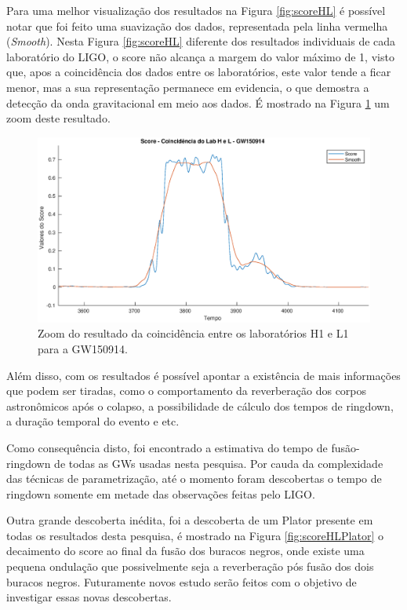 Para uma melhor visualização dos resultados na Figura \ref{fig:scoreHL} é possível notar que foi feito uma suavização dos dados, representada pela linha vermelha (\textit{Smooth}). Nesta Figura \ref{fig:scoreHL} diferente dos resultados individuais de cada laboratório do LIGO, o score não alcança a margem do valor máximo de 1, visto que, apos a coincidência dos dados entre os laboratórios, este valor tende a ficar menor, mas a sua representação permanece em evidencia, o que demostra a detecção da onda gravitacional em meio aos dados. É mostrado na Figura \ref{fig:scoreHLZoom} um zoom deste resultado.

\begin{figure}[H]
\centering
\includegraphics[width=1\textwidth]{figuras/GW150914_LabHL_zoom.eps}
\caption{Zoom do resultado da coincidência entre os laboratórios H1 e L1 para a GW150914.}
\label{fig:scoreHLZoom}
\end{figure}

Além disso, com os resultados é possível apontar a existência de mais informações que podem ser tiradas, como o comportamento da reverberação dos corpos astronômicos após o colapso, a possibilidade de cálculo dos tempos de ringdown, a duração temporal do evento e etc.

Como consequência disto, foi encontrado a estimativa do tempo de fusão-ringdown de todas as GWs usadas nesta pesquisa. Por cauda da complexidade das técnicas de parametrização, até o momento foram descobertas o tempo de ringdown somente em metade das observações feitas pelo LIGO.

Outra grande descoberta inédita, foi a descoberta de um Plator presente em todas os resultados desta pesquisa, é mostrado na Figura \ref{fig:scoreHLPlator} o decaimento do score ao final da fusão dos buracos negros, onde existe uma pequena ondulação que possivelmente seja a reverberação pós fusão dos dois buracos negros. Futuramente novos estudo serão feitos com o objetivo de investigar essas novas descobertas.

